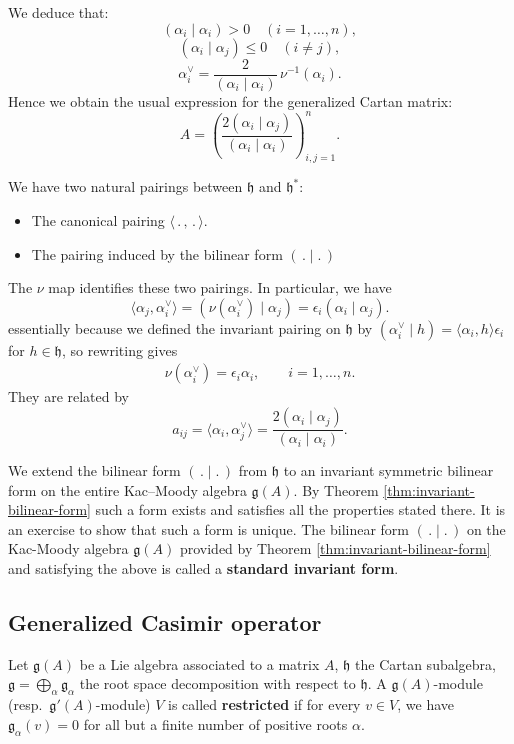 \documentclass[12pt]{article}
\begin{document}
We deduce that:
\[
    (\alpha_i\mid \alpha_i)>0 \quad (i=1,\dots,n),
\]
\[
    (\alpha_i\mid \alpha_j)\leq 0 \quad (i\neq j),
\]
\[
    \alpha_i^\vee = \frac{2}{(\alpha_i\mid \alpha_i)}\,\nu^{-1}(\alpha_i).
\]
Hence we obtain the usual expression for the generalized Cartan matrix:
\[
    A=\left(\frac{2(\alpha_i\mid \alpha_j)}{(\alpha_i\mid \alpha_i)}\right)_{i,j=1}^n.
\]

\begin{remark}
    We have two natural pairings between $\mathfrak{h}$ and $\mathfrak{h}^*$:
    \begin{itemize}
        \item The canonical pairing $\langle \,.\,,\,.\,\rangle$.
        \item The pairing induced by the bilinear form $(\,.\mid.\,)$
        \end{itemize}
    The $\nu$ map identifies these two pairings. In particular, we have
    \[
        \langle \alpha_j, \alpha_i^\vee \rangle = (\nu
        (\alpha_i^\vee) \mid \alpha_j) = \epsilon_i (\alpha_i \mid \alpha_j).
    \] essentially because we defined the invariant pairing on $\mathfrak{h}$ by
$(\alpha_i^\vee \mid h) = \langle \alpha_i, h \rangle \epsilon_i$ for $h \in \mathfrak{h}$, so rewriting gives
\begin{align*}
    \nu(\alpha_i^\vee) = \epsilon_i \alpha_i,
    \qquad i=1,\ldots,n.
\end{align*}
    They are related by
    \[
        a_{ij} = \langle \alpha_i, \alpha_j^\vee \rangle = \frac{2(\alpha_i\mid \alpha_j)}{(\alpha_i\mid \alpha_i)}.
    \]
\end{remark}

We extend the bilinear form $(\,.\mid.\,)$ from $\mathfrak h$ to an
invariant symmetric bilinear form on the entire Kac–Moody algebra
$\mathfrak g(A)$. By Theorem \ref{thm:invariant-bilinear-form} such a form exists and satisfies all the properties stated there. It is an exercise to show that such a form is unique. The bilinear form $(\,.\mid.\,)$ on the Kac-Moody algebra $\mathfrak g(A)$ provided by Theorem \ref{thm:invariant-bilinear-form} and
satisfying the above is called a \textbf{standard invariant form}.

\subsection{Generalized Casimir operator}
Let $\mathfrak{g}(A)$ be a Lie algebra associated to a matrix $A$,
$\mathfrak{h}$ the Cartan subalgebra,
$\mathfrak{g} = \bigoplus_\alpha \mathfrak{g}_\alpha$ the root space decomposition with respect to $\mathfrak{h}$.
A $\mathfrak{g}(A)$-module (resp.\ $\mathfrak{g}'(A)$-module) $V$ is called \textbf{restricted} if for every $v\in V$,
we have $\mathfrak{g}_\alpha(v)=0$ for all but a finite number of positive roots $\alpha$.
\end{document}
